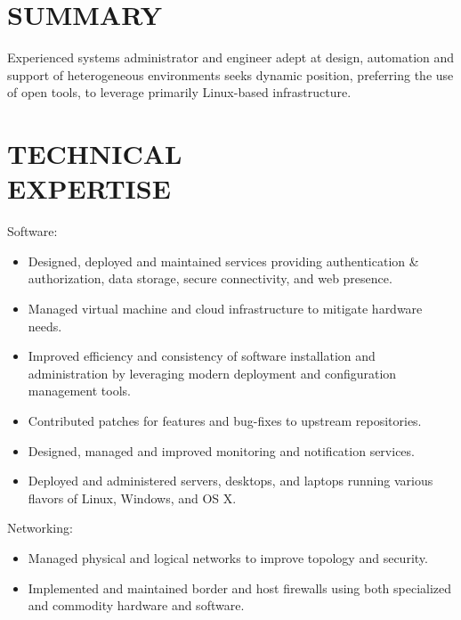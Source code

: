 \documentclass[line,margin]{res}
\begin{document}


 
\begin{resume}
 
\section{SUMMARY}
    Experienced systems administrator and engineer adept at design,
    automation and support of heterogeneous environments seeks dynamic
    position, preferring the use of open tools, to leverage primarily
    Linux-based infrastructure. 
 

\section{TECHNICAL \\ EXPERTISE}
    Software:
    \vspace{1 mm}
    \begin{itemize} \itemsep -1.5pt %
        \item Designed, deployed and maintained services providing
        authentication \& authorization, data storage, secure
        connectivity, and web presence.
        \item Managed virtual machine and cloud infrastructure to mitigate
        hardware needs.
        \item Improved efficiency and consistency of software installation
        and administration by leveraging modern deployment and
        configuration management tools.
        \item Contributed patches for features and bug-fixes to upstream
        repositories.
        \item Designed, managed and improved monitoring and notification
        services.
        \item Deployed and administered servers, desktops, and laptops
        running various flavors of Linux, Windows, and OS X.
    \end{itemize}
    \vspace{-3 mm}

    Networking:
    \vspace{1 mm}
    \begin{itemize} \itemsep -1.5pt %
        \item Managed physical and logical networks to improve topology
        and security.
        \item Implemented and maintained border and host firewalls using
        both specialized and commodity hardware and software.
    \end{itemize}
    \vspace{-3 mm}


\end{resume}
\end{document}
